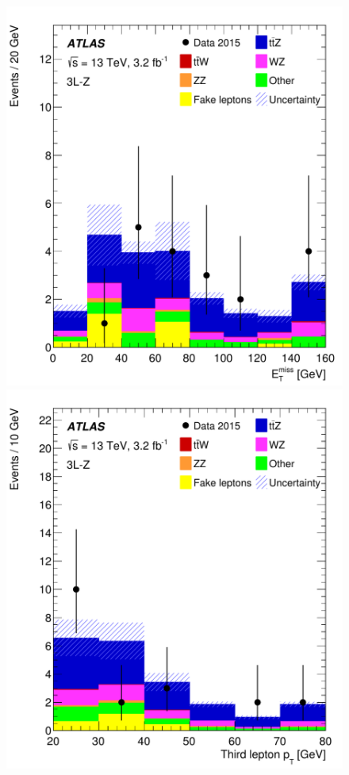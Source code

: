 \begin{figure}[htbp]
\includegraphics[width=\twofigwidth]{SR3lZMET}
\includegraphics[width=\twofigwidth]{SR3lZpT3lep}

\end{figure}
